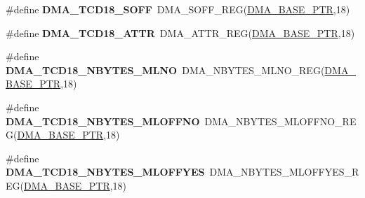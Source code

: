 \begin{DoxyCompactItemize}
\item 
\hypertarget{group___d_m_a___register___accessor___macros_gae5c58dfd7fcf13a20818acd9ae70ba79}{}\#define {\bfseries D\+M\+A\+\_\+\+T\+C\+D18\+\_\+\+S\+O\+F\+F}~D\+M\+A\+\_\+\+S\+O\+F\+F\+\_\+\+R\+E\+G(\hyperlink{group___d_m_a___peripheral_ga6997fbc1b1973e9f27170217a3bd6f22}{D\+M\+A\+\_\+\+B\+A\+S\+E\+\_\+\+P\+T\+R},18)\label{group___d_m_a___register___accessor___macros_gae5c58dfd7fcf13a20818acd9ae70ba79}

\item 
\hypertarget{group___d_m_a___register___accessor___macros_ga22357e5e8fe6af9974ada7c0ce25166c}{}\#define {\bfseries D\+M\+A\+\_\+\+T\+C\+D18\+\_\+\+A\+T\+T\+R}~D\+M\+A\+\_\+\+A\+T\+T\+R\+\_\+\+R\+E\+G(\hyperlink{group___d_m_a___peripheral_ga6997fbc1b1973e9f27170217a3bd6f22}{D\+M\+A\+\_\+\+B\+A\+S\+E\+\_\+\+P\+T\+R},18)\label{group___d_m_a___register___accessor___macros_ga22357e5e8fe6af9974ada7c0ce25166c}

\item 
\hypertarget{group___d_m_a___register___accessor___macros_ga9f7c4ca9babea1be6fce515a7986d312}{}\#define {\bfseries D\+M\+A\+\_\+\+T\+C\+D18\+\_\+\+N\+B\+Y\+T\+E\+S\+\_\+\+M\+L\+N\+O}~D\+M\+A\+\_\+\+N\+B\+Y\+T\+E\+S\+\_\+\+M\+L\+N\+O\+\_\+\+R\+E\+G(\hyperlink{group___d_m_a___peripheral_ga6997fbc1b1973e9f27170217a3bd6f22}{D\+M\+A\+\_\+\+B\+A\+S\+E\+\_\+\+P\+T\+R},18)\label{group___d_m_a___register___accessor___macros_ga9f7c4ca9babea1be6fce515a7986d312}

\item 
\hypertarget{group___d_m_a___register___accessor___macros_ga948f89eb03a3b03fb4494d7d4726d527}{}\#define {\bfseries D\+M\+A\+\_\+\+T\+C\+D18\+\_\+\+N\+B\+Y\+T\+E\+S\+\_\+\+M\+L\+O\+F\+F\+N\+O}~D\+M\+A\+\_\+\+N\+B\+Y\+T\+E\+S\+\_\+\+M\+L\+O\+F\+F\+N\+O\+\_\+\+R\+E\+G(\hyperlink{group___d_m_a___peripheral_ga6997fbc1b1973e9f27170217a3bd6f22}{D\+M\+A\+\_\+\+B\+A\+S\+E\+\_\+\+P\+T\+R},18)\label{group___d_m_a___register___accessor___macros_ga948f89eb03a3b03fb4494d7d4726d527}

\item 
\hypertarget{group___d_m_a___register___accessor___macros_ga34ffa6ababf18a651a82573b1181953a}{}\#define {\bfseries D\+M\+A\+\_\+\+T\+C\+D18\+\_\+\+N\+B\+Y\+T\+E\+S\+\_\+\+M\+L\+O\+F\+F\+Y\+E\+S}~D\+M\+A\+\_\+\+N\+B\+Y\+T\+E\+S\+\_\+\+M\+L\+O\+F\+F\+Y\+E\+S\+\_\+\+R\+E\+G(\hyperlink{group___d_m_a___peripheral_ga6997fbc1b1973e9f27170217a3bd6f22}{D\+M\+A\+\_\+\+B\+A\+S\+E\+\_\+\+P\+T\+R},18)\label{group___d_m_a___register___accessor___macros_ga34ffa6ababf18a651a82573b1181953a}


\end{DoxyCompactItemize}
